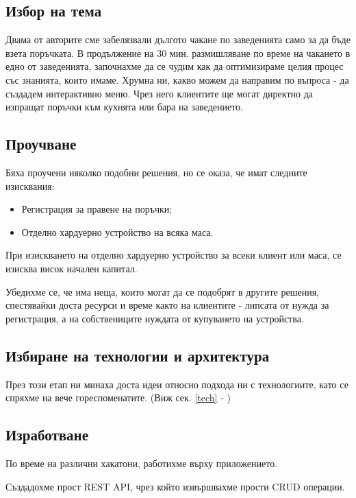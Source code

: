 \documentclass[a4paper]{article}
\begin{document}
\begin{Large}
\subsection{Избор на тема}

Двама от авторите сме забелязвали дългото чакане по заведенията само за да бъде взета поръчката. В продължение на 30 мин. размишляване по време на чакането в едно от заведенията, започнахме да се чудим как да оптимизираме целия процес със знанията, които имаме. Хрумна ни, какво можем да направим по въпроса - да създадем интерактивно меню. Чрез него клиентите ще могат директно да изпращат поръчки към кухнята или бара на заведението.

\subsection{Проучване}

Бяха проучени няколко подобни решения, но се оказа, че имат следните изисквания:
\begin{itemize}
\item Регистрация за правене на поръчки;
\item Отделно хардуерно устройство на всяка маса.
\end{itemize}

При изискването на отделно хардуерно устройство за всеки клиент или маса, се изисква висок начален капитал.

Убедихме се, че има неща, които могат да се подобрят в другите решения, спестявайки доста ресурси и време както на клиентите - липсата от нужда за регистрация, а на собствениците нуждата от купуването на устройства.

\subsection{Избиране на технологии и архитектура}

През този етап ни минаха доста идеи относно подхода ни с технологиите, като се спряхме на вече гореспоменатите. (Виж сек. \ref{tech} - )

\subsection{Изработване}

По време на различни хакатони, работихме върху приложението.

Създадохме прост REST API, чрез който извършвахме прости CRUD операции.


\end{Large}
\end{document}

